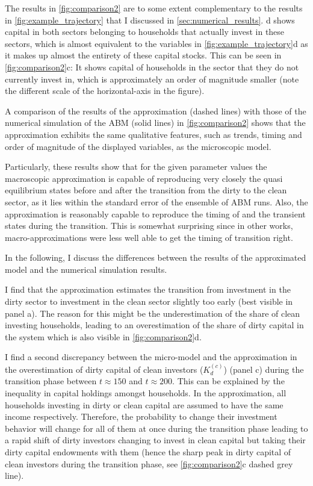 The results in \cref{fig:comparison2} are to some extent complementary to the results in \cref{fig:example_trajectory} that I discussed in \cref{sec:numerical_results}. d shows capital in both sectors belonging to households that actually invest in these sectors, which is almost equivalent to the variables in \cref{fig:example_trajectory}d as it makes up almost the entirety of these capital stocks. This can be seen in \cref{fig:comparison2}c: It shows capital of households in the sector that they do not currently invest in, which is approximately an order of magnitude smaller (note the different scale of the horizontal-axis in the figure).

A comparison of the results of the approximation (dashed lines) with those of the numerical simulation of the ABM (solid lines) in \cref{fig:comparison2} shows that the approximation exhibits the same qualitative features, such as trends, timing and order of magnitude of the displayed variables, as the microscopic model.

Particularly, these results show that for the given parameter values the macroscopic approximation is capable of reproducing very closely the quasi equilibrium states before and after the transition from the dirty to the clean sector, as it lies within the standard error of the ensemble of ABM runs. Also, the approximation is reasonably capable to reproduce the timing of and the transient states during the transition. This is somewhat surprising since in other works, macro-approximations were less well able to get the timing of transition right.

In the following, I discuss the differences between the results of the approximated model and the numerical simulation results. 

I find that the approximation estimates the transition from investment in the dirty sector to investment in the clean sector slightly too early (best visible in panel a). The reason for this might be the underestimation of the share of clean investing households, leading to an overestimation of the share of dirty capital in the system which is also visible in \cref{fig:comparison2}d.

I find a second discrepancy between the micro-model and the approximation in the overestimation of dirty capital of clean investors ($K_d^{(c)}$) (panel c) during the transition phase between $t\approx 150$ and $t \approx 200$. This can be explained by the inequality in capital holdings amongst households. In the approximation, all households investing in dirty or clean capital are assumed to have the same income respectively. Therefore, the probability to change their investment behavior will change for all of them at once during the transition phase leading to a rapid shift of dirty investors changing to invest in clean capital but taking their dirty capital endowments with them (hence the sharp peak in dirty capital of clean investors during the transition phase, see \cref{fig:comparison2}c dashed grey line). 

